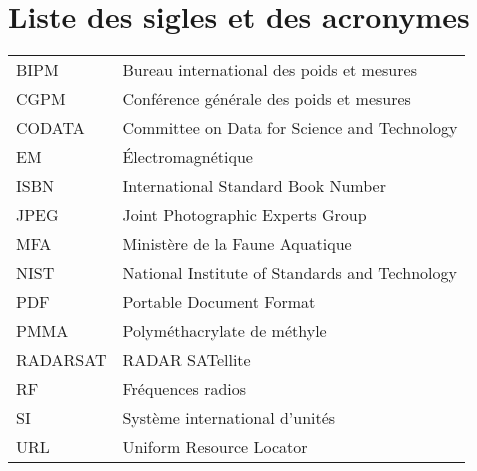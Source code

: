 
%
%

\chapter{Liste des sigles et des acronymes}


\begin{flushleft}
   \begin{tabular}{@{}ll}
      BIPM & Bureau international des poids et mesures\\
      CGPM & Conférence générale des poids et mesures\\
      CODATA & Committee on Data for Science and Technology\\
      EM & Électromagnétique\\
      ISBN & International Standard Book Number\\
      JPEG & Joint Photographic Experts Group\\
      MFA & Ministère de la Faune Aquatique \\
      NIST & National Institute of Standards and Technology \\
      PDF & Portable Document Format \\
      PMMA & Polyméthacrylate de méthyle\\
      RADARSAT & RADAR SATellite\\
      RF & Fréquences radios\\
      SI & Système international d'unités \\
      URL & Uniform Resource Locator \\
   \end{tabular}
\end{flushleft}






